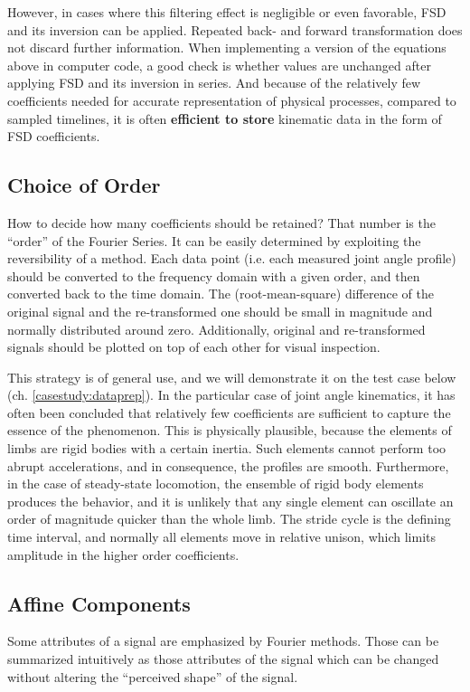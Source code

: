 \documentclass[10pt,a4paper]{article}
\begin{document}
However, in cases where this filtering effect is negligible or even favorable, FSD and its inversion can be applied.
Repeated back- and forward transformation does not discard further information.
When implementing a version of the equations above in computer code, a good check is whether values are unchanged after applying FSD and its inversion in series.
And because of the relatively few coefficients needed for accurate representation of physical processes, compared to sampled timelines, it is often \textbf{efficient to store} kinematic data in the form of FSD coefficients.

\subsection{Choice of Order}
\label{sec:org520e10c}
How to decide how many coefficients should be retained?
That number is the ``order'' of the Fourier Series.
It can be easily determined by exploiting the reversibility of a method.
Each data point (i.e. each measured joint angle profile) should be converted to the frequency domain with a given order, and then converted back to the time domain.
The (root-mean-square) difference of the original signal and the re-transformed one should be small in magnitude and normally distributed around zero.
Additionally, original and re-transformed signals should be plotted on top of each other for visual inspection.


This strategy is of general use, and we will demonstrate it on the test case below (ch. \ref{casestudy:dataprep}).
In the particular case of joint angle kinematics, it has often been concluded that relatively few coefficients are sufficient to capture the essence of the phenomenon.
This is physically plausible, because the elements of limbs are rigid bodies with a certain inertia.
Such elements cannot perform too abrupt accelerations, and in consequence, the profiles are smooth.
Furthermore, in the case of steady-state locomotion, the ensemble of rigid body elements produces the behavior, and it is unlikely that any single element can oscillate an order of magnitude quicker than the whole limb.
The stride cycle is the defining time interval, and normally all elements move in relative unison, which limits amplitude in the higher order coefficients.


\subsection{Affine Components}
\label{sec:org875d674}
Some attributes of a signal are emphasized by Fourier methods.
Those can be summarized intuitively as those attributes of the signal which can be changed without altering the ``perceived shape'' of the signal.
\end{document}
